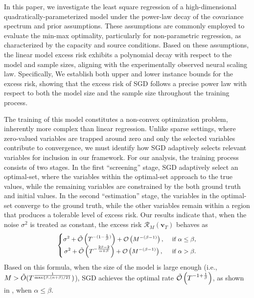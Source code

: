 \iffalse
In this paper, we investigate the least square regression of a high-dimensional quadratically-parameterized model under the power-law decay of the covariance spectrum and prior assumptions. 
These assumptions are commonly employed to evaluate the min-max optimality, particularly for non-parametric regression, as characterized by the capacity and source conditions.
Based on these assumptions, the linear model excess risk exhibits a polynomial decay with respect to the model  and sample sizes, aligning with the experimentally observed neural scaling law.
Specifically, 
We establish both upper and lower instance bounds for the excess risk, showing that the excess risk of SGD follows a precise power law with respect to both the model size and the sample size throughout the training process.

The training of this model constitutes a non-convex optimization problem,  inherently more complex than linear regression.
Unlike sparse settings, where zero-valued variables are trapped around  zero and only the selected variables contribute to convergence, we must identify how SGD adaptively selects relevant variables for inclusion in our framework.
For our analysis, the training process consists of two stages. In the first ``screening'' stage, SGD adaptively select an optimal-set, where the variables within the optimal-set approach to the true values, while the remaining variables are constrained by the both ground truth and initial values. In the second ``estimation'' stage, the variables in the optimal-set converge to the ground truth, while the other variables remain within a region that produces a tolerable level of excess risk. 
Our results indicate that, when the noise $\sigma^2$ is treated as constant, the excess risk $\mathcal{R}_M\left ( \mathbf{v}_T  \right )$ behaves as 
\begin{equation}\nonumber
\small
\begin{aligned}
    \left\{\begin{matrix}
\sigma^2+\Tilde{\mathcal{O}}\left(T^{-(1-\frac{1}{\beta})}\right)+\mathcal{O}\left(M^{-(\beta-1)}\right),&\text{ if } \alpha\le \beta, \\
\sigma^2+\Tilde{\mathcal{O}}\left(T^{-\frac{2\beta-2}{\alpha+\beta}}\right)+\mathcal{O}\left(M^{-(\beta-1)}\right),&\text{ if } \alpha> \beta.
\end{matrix}\right.
\end{aligned}
\end{equation}
Based on this formula, when the size of the model is large enough (i.e., $M>\Tilde{O}(T^{\frac{1}{\max\{\beta, (\alpha+\beta)/2\}}})$), SGD achieves the optimal rate $\Tilde{\mathcal{O}} \left ( T^{-1+\frac{1}{\beta} } \right ) $,  as shown in \citet{caponnetto2007optimal}, when $\alpha\le \beta$.
